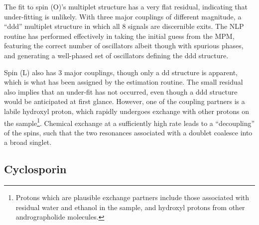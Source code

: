 The fit to spin (O)'s multiplet structure has a very flat residual, indicating
that under-fitting is unlikely. With three major couplings of
different magnitude, a ``ddd'' multiplet structure in which all 8 signals
are discernible exits. The \ac{NLP} routine has performed effectively in
taking the initial guess from the \ac{MPM}, featuring the correct number of
oscillators albeit though with spurious phases, and generating a well-phased
set of oscillators defining the ddd structure.

Spin (L) also has 3 major couplings, though only a
dd structure is apparent, which is what has been assigned by the estimation
routine. The small residual  also implies that an under-fit has not occurred,
even though a ddd structure would be anticipated at first glance. However, one
of the coupling partners is a labile hydroxyl proton, which rapidly undergoes
exchange with other protons on the sample\footnote{
    Protons which are plausible exchange partners include those associated with
    residual water and ethanol in the sample, and hydroxyl protons from other
    andrographolide molecules.
}. Chemical exchange at a sufficiently
high rate leads to a ``decoupling'' of the spins, such that the two resonances
associated with a doublet coalesce into a broad singlet\cite[Section
2.6.1.5]{Claridge2016}.


\subsection{Cyclosporin}
